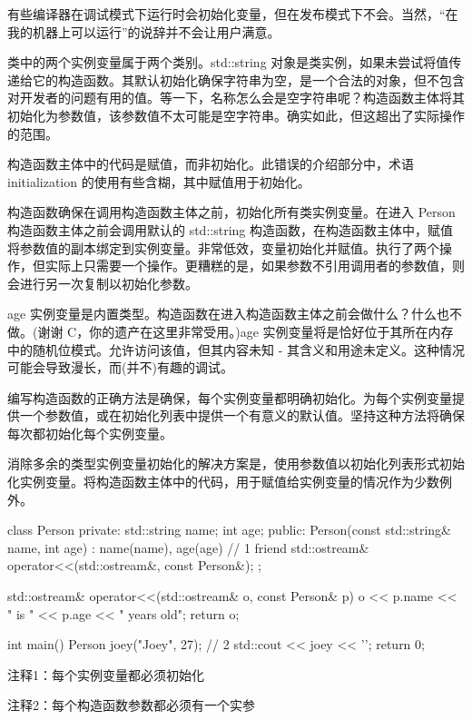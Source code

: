 有些编译器在调试模式下运行时会初始化变量，但在发布模式下不会。当然，“在我的机器上可以运行”的说辞并不会让用户满意。


类中的两个实例变量属于两个类别。std::string 对象是类实例，如果未尝试将值传递给它的构造函数。其默认初始化确保字符串为空，是一个合法的对象，但不包含对开发者的问题有用的值。等一下，名称怎么会是空字符串呢？构造函数主体将其初始化为参数值，该参数值不太可能是空字符串。确实如此，但这超出了实际操作的范围。

构造函数主体中的代码是赋值，而非初始化。此错误的介绍部分中，术语 initialization 的使用有些含糊，其中赋值用于初始化。

构造函数确保在调用构造函数主体之前，初始化所有类实例变量。在进入 Person 构造函数主体之前会调用默认的 std::string 构造函数，在构造函数主体中，赋值将参数值的副本绑定到实例变量。非常低效，变量初始化并赋值。执行了两个操作，但实际上只需要一个操作。更糟糕的是，如果参数不引用调用者的参数值，则会进行另一次复制以初始化参数。

age 实例变量是内置类型。构造函数在进入构造函数主体之前会做什么？什么也不做。(谢谢 C，你的遗产在这里非常受用。)age 实例变量将是恰好位于其所在内存中的随机位模式。允许访问该值，但其内容未知 - 其含义和用途未定义。这种情况可能会导致漫长，而(并不)有趣的调试。


编写构造函数的正确方法是确保，每个实例变量都明确初始化。为每个实例变量提供一个参数值，或在初始化列表中提供一个有意义的默认值。坚持这种方法将确保每次都初始化每个实例变量。

消除多余的类型实例变量初始化的解决方案是，使用参数值以初始化列表形式初始化实例变量。将构造函数主体中的代码，用于赋值给实例变量的情况作为少数例外。


\begin{cpp}
class Person {
private:
  std::string name;
  int age;
public:
  Person(const std::string& name, int age) :
  name(name), age(age) {} // 1
  friend std::ostream& operator<<(std::ostream&, const Person&);
};

std::ostream& operator<<(std::ostream& o, const Person& p) {
  o << p.name << " is " << p.age << " years old";
  return o;
}

int main() {
  Person joey("Joey", 27); // 2
  std::cout << joey << '\n';
  return 0;
}
\end{cpp}

{\footnotesize
注释1：每个实例变量都必须初始化

注释2：每个构造函数参数都必须有一个实参
}

